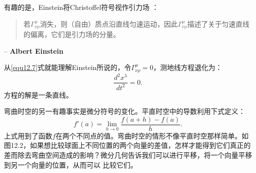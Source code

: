 有趣的是，Einstein将Christoffel符号视作引力场%
%
：
\begin{quote}
若$\Gamma^\mu_{\nu \rho}$消失，则（自由）质点沿直线匀速运动，因此$\Gamma^\mu_{\nu \rho}$描述了关于匀速直线的偏离，它们是引力场的分量。
\end{quote}
\begin{flushright}
-- {\bf Albert Einstein}
\end{flushright}
从\ref{equ12.7}式就能理解Einstein所说的，令$\Gamma^\mu_{\nu \rho} = 0$，测地线方程退化为：
\begin{equation}
\label{equ12.8}
    \frac{d^2 x^\lambda}{dt^2} = 0.
\end{equation}
方程的解是一条直线。

弯曲时空的另一有趣事实是微分符号的变化。平直时空中的导数利用下式定义：
\begin{equation}
\label{equ12.9}
    f'(a) = \lim_{h \to 0} \frac{f(a + h) - f(a)}{h}.
\end{equation}
上式用到了函数$f$在两个不同点的值。弯曲时空的情形不像平直时空那样简单。如图12.2，如果想比较球面上不同位置的两个向量的差值，怎样才能得到它们真正的差而除去弯曲空间造成的影响？微分几何告诉我们可以进行平移，将一个向量平移到另一个向量的位置，从而可以%
%
比较它们。


